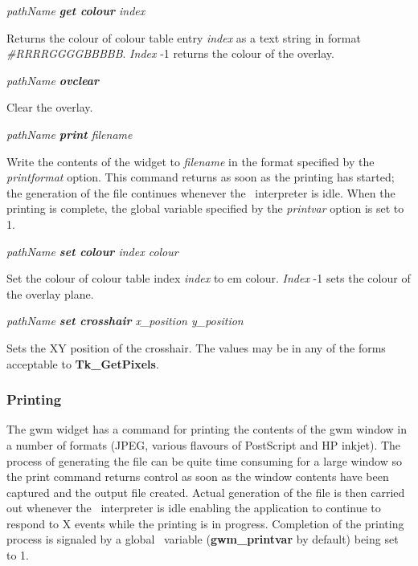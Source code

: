 {\em pathName {\bf get colour} index}
\begin{rquote}
Returns the colour of colour table entry {\em index} as a text string in
format \hbox{\em \#RRRRGGGGBBBBB}. {\em Index} -1 returns the
colour of the overlay.
\end{rquote}

{\em pathName {\bf ovclear}}
\begin{rquote}
Clear the overlay.
\end{rquote}

{\em pathName {\bf print} filename}
\begin{rquote}
Write the contents of the widget to {\em filename} in the format specified
by the {\em printformat} option. This command returns as soon as the printing
has started; the generation of the file continues whenever the \Tcl\ interpreter
is idle. When the printing is complete, the global variable specified by the
{\em printvar} option is set to 1.
\end{rquote}

{\em pathName {\bf set colour} index colour}
\begin{rquote}
Set the colour of colour table index {\em index} to {em colour}. {\em Index}
-1 sets the colour of the overlay plane.
\end{rquote}

{\em pathName {\bf set crosshair} x\_position y\_position}
\begin{rquote}
Sets the XY position of the crosshair.
The values may be in any of the forms acceptable to {\bf Tk\_GetPixels}.
\end{rquote}

\subsubsection{Printing}

The gwm widget has a command for printing the contents of the gwm window in
a number of formats (JPEG, various flavours of PostScript and HP inkjet).
The process of generating the file can be quite time consuming for a large
window so the print command returns control as soon as the window contents
have been captured and the output file created. Actual generation of the
file is then carried out whenever the \Tcl\ interpreter is idle enabling the
application to continue to respond to X events while the printing is in
progress.
Completion of the printing process is signaled by a global \Tcl\ variable
({\bf gwm\_printvar} by default) being set to 1.

